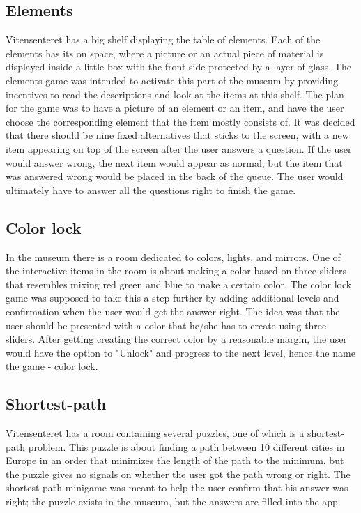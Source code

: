 \subsection{Elements}
Vitensenteret has a big shelf displaying the table of elements. Each of the elements has its on space, where a picture or an actual piece of material is displayed inside a little box with the front side protected by a layer of glass. The elements-game was intended to activate this part of the museum by providing incentives to read the descriptions and look at the items at this shelf. The plan for the game was to have a picture of an element or an item, and have the user choose the corresponding element that the item mostly consists of. It was decided that there should be nine fixed alternatives that sticks to the screen, with a new item appearing on top of the screen after the user answers a question. If the user would answer wrong, the next item would appear as normal, but the item that was answered wrong would be placed in the back of the queue. The user would ultimately have to answer all the questions right to finish the game.

\subsection{Color lock}
In the museum there is a room dedicated to colors, lights, and mirrors. One of the interactive items in the room is about making a color based on three sliders that resembles mixing red green and blue to make a certain color. The color lock game was supposed to take this a step further by adding additional levels and confirmation when the user would get the answer right. The idea was that the user should be presented with a color that he/she has to create using three sliders. After getting creating the correct color by a reasonable margin, the user would have the option to "Unlock" and progress to the next level, hence the name the game - color lock.

\subsection{Shortest-path}
Vitensenteret has a room containing several puzzles, one of which is a shortest-path problem. This puzzle is about finding a path between 10 different cities in Europe in an order that minimizes the length of the path to the minimum, but the puzzle gives no signals on whether the user got the path wrong or right. The shortest-path minigame was meant to help the user confirm that his answer was right; the puzzle exists in the museum, but the answers are filled into the app.

